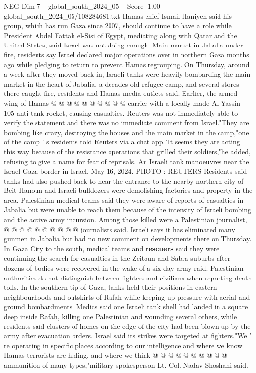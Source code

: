 \begin{textsample}{NEG Dim 7 – global\_south\_2024\_05 – Score -1.00 – global\_south\_2024\_05/108284681.txt}
Hamas chief Ismail Haniyeh said his group, which has run Gaza since 2007, should continue to have a role while President Abdel Fattah el-Sisi of Egypt, mediating along with Qatar and the United States, said Israel was not doing enough.
Main market in Jabalia under fire, residents say Israel declared major operations over in northern Gaza months ago while pledging to return to prevent Hamas regrouping.
On Thursday, around a week after they moved back in, Israeli tanks were heavily bombarding the main market in the heart of Jabalia, a decades-old refugee camp, and several stores there caught fire, residents and Hamas media outlets said.
Earlier, the armed wing of Hamas @ @ @ @ @ @ @ @ @ @ carrier with a locally-made Al-Yassin 105 anti-tank rocket, causing casualties.
Reuters was not immediately able to verify the statement and there was no immediate comment from Israel."They are bombing like crazy, destroying the houses and the main market in the camp,"one of the camp ' s residents told Reuters via a chat app."It seems they are acting this way because of the resistance operations that grilled their soldiers,"he added, refusing to give a name for fear of reprisals.
An Israeli tank manoeuvres near the Israel-Gaza border in Israel, May 16, 2024.
PHOTO : REUTERS Residents said tanks had also pushed back to near the entrance to the nearby northern city of Beit Hanoun and Israeli bulldozers were demolishing factories and property in the area.
Palestinian medical teams said they were aware of reports of casualties in Jabalia but were unable to reach them because of the intensity of Israeli bombing and the active army incursion.
Among those killed were a Palestinian journalist, @ @ @ @ @ @ @ @ @ @ journalists said.
Israeli says it has eliminated many gunmen in Jabalia but had no new comment on developments there on Thursday.
In Gaza City to the south, medical teams and \textbf{rescuers} said they were continuing the search for casualties in the Zeitoun and Sabra suburbs after dozens of bodies were recovered in the wake of a six-day army raid.
Palestinian authorities do not distinguish between fighters and civilians when reporting death tolls.
In the southern tip of Gaza, tanks held their positions in eastern neighbourhoods and outskirts of Rafah while keeping up pressure with aerial and ground bombardments.
Medics said one Israeli tank shell had landed in a square deep inside Rafah, killing one Palestinian and wounding several others, while residents said clusters of homes on the edge of the city had been blown up by the army after evacuation orders.
Israel said its strikes were targeted at fighters."We ' re operating in specific places according to our intelligence and where we know Hamas terrorists are hiding, and where we think @ @ @ @ @ @ @ @ @ @ ammunition of many types,"military spokesperson Lt.
Col.
Nadav Shoshani said.

\end{textsample}
